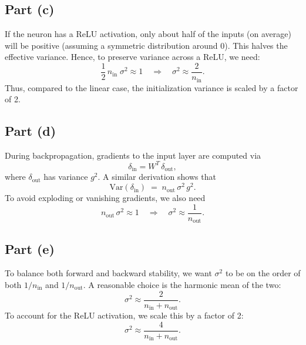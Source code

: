 \documentclass{article}
\begin{document}
\subsection*{Part (c)}
If the neuron has a ReLU activation, only about half of the inputs (on average) will be positive (assuming a symmetric distribution around 0). This halves the effective variance. Hence, to preserve variance across a ReLU, we need:
\[
\frac{1}{2}\,n_{\text{in}}\;\sigma^2 \approx 1
\quad\Longrightarrow\quad
\sigma^2 \approx \frac{2}{n_{\text{in}}}.
\]
Thus, compared to the linear case, the initialization variance is scaled by a factor of 2.

\subsection*{Part (d)}
During backpropagation, gradients to the input layer are computed via
\[
\delta_{\text{in}} = W^T\,\delta_{\text{out}},
\]
where $\delta_{\text{out}}$ has variance $g^2$. A similar derivation shows that
\[
\mathrm{Var}(\delta_{\text{in}}) \;=\; n_{\text{out}}\,\sigma^2\,g^2.
\]
To avoid exploding or vanishing gradients, we also need
\[
n_{\text{out}}\,\sigma^2 \approx 1 
\quad\Longrightarrow\quad
\sigma^2 \approx \frac{1}{n_{\text{out}}}.
\]

\subsection*{Part (e)}
To balance both forward and backward stability, we want $\sigma^2$ to be on the order of both $1/n_{\text{in}}$ and $1/n_{\text{out}}$. A reasonable choice is the harmonic mean of the two:
\[
\sigma^2 \approx \frac{2}{n_{\text{in}} + n_{\text{out}}}.
\]
To account for the ReLU activation, we scale this by a factor of 2:
\[
\sigma^2 \approx \frac{4}{n_{\text{in}} + n_{\text{out}}}.
\]


\end{document}
